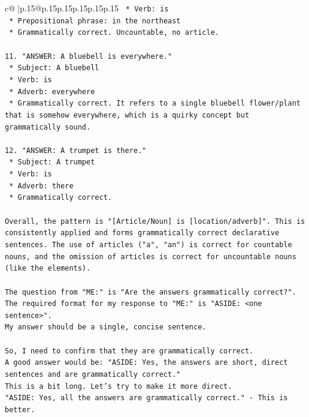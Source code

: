 \documentclass{article}
\begin{document}
{\begin{supertabular}{c@{$\;$}|p{.15\linewidth}@{}p{.15\linewidth}p{.15\linewidth}p{.15\linewidth}p{.15\linewidth}p{.15\linewidth}}
{{{\texttt{    *   Verb: is} \\
\texttt{    *   Prepositional phrase: in the northeast} \\
\texttt{    *   Grammatically correct. Uncountable, no article.} \\
\\ 
\texttt{11. "ANSWER: A bluebell is everywhere."} \\
\texttt{    *   Subject: A bluebell} \\
\texttt{    *   Verb: is} \\
\texttt{    *   Adverb: everywhere} \\
\texttt{    *   Grammatically correct. It refers to a single bluebell flower/plant that is somehow everywhere, which is a quirky concept but grammatically sound.} \\
\\ 
\texttt{12. "ANSWER: A trumpet is there."} \\
\texttt{    *   Subject: A trumpet} \\
\texttt{    *   Verb: is} \\
\texttt{    *   Adverb: there} \\
\texttt{    *   Grammatically correct.} \\
\\ 
\texttt{Overall, the pattern is "{[}Article/Noun{]} is {[}location/adverb{]}". This is consistently applied and forms grammatically correct declarative sentences. The use of articles ("a", "an") is correct for countable nouns, and the omission of articles is correct for uncountable nouns (like the elements).} \\
\\ 
\texttt{The question from "ME:" is "Are the answers grammatically correct?".} \\
\texttt{The required format for my response to "ME:" is "ASIDE: <one sentence>".} \\
\texttt{My answer should be a single, concise sentence.} \\
\\ 
\texttt{So, I need to confirm that they are grammatically correct.} \\
\texttt{A good answer would be: "ASIDE: Yes, the answers are short, direct sentences and are grammatically correct."} \\
\texttt{This is a bit long. Let's try to make it more direct.} \\
\texttt{"ASIDE: Yes, all the answers are grammatically correct." {-} This is better.} \\
}}}
\end{supertabular}}
\end{document}
